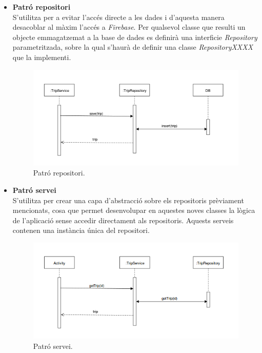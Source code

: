\begin{itemize}
\clearpage

\item{\textbf{Patró repositori}}\\
S'utilitza per a evitar l'accés directe a les dades i d'aquesta manera desacoblar al màxim l'accés a \textit{Firebase}. Per qualsevol classe que resulti un objecte emmagatzemat a la base de dades es definirà una interficie \textit{Repository} parametritzada, sobre la qual s'haurà de definir una classe \textit{RepositoryXXXX} que la implementi.

\begin{figure}[!h]
\centering
\includegraphics[scale=0.75]{Figures/patroRepositori.png}
\caption{Patró repositori.}
\end{figure}

\item{\textbf{Patró servei}}\\
S'utilitza per crear una capa d'abstracció sobre els repositoris prèviament mencionats, cosa que permet desenvolupar en aquestes noves classes la lògica de l'aplicació sense accedir directament als repositoris. Aquests serveis contenen una instància única del repositori.

\begin{figure}[!h]
\centering
\includegraphics[scale=0.75]{Figures/patroServei.png}
\caption{Patró servei.}
\end{figure}

\end{itemize}

